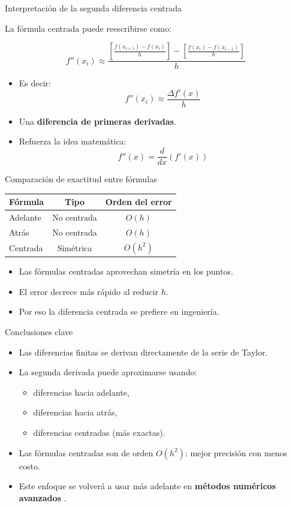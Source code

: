 \documentclass[main.tex]{subfiles}
\begin{document}
\begin{frame}{Interpretación de la segunda diferencia centrada}
\small

La fórmula centrada puede reescribirse como:

\[
f''(x_i) \approx 
\frac{
\left[\frac{f(x_{i+1}) - f(x_i)}{h}\right]
-
\left[\frac{f(x_i) - f(x_{i-1})}{h}\right]
}{h}
\]

\begin{itemize}
  \item Es decir:  
  \[
  f''(x_i) \approx 
  \frac{\Delta f'(x)}{h}
  \]
  \item Una \textbf{diferencia de primeras derivadas}.
  \item Refuerza la idea matemática:
        \[
        f''(x)=\frac{d}{dx}\left(f'(x)\right)
        \]
\end{itemize}

\end{frame}


\begin{frame}{Comparación de exactitud entre fórmulas}
\small

\begin{tabular}{lcc}
\toprule
Fórmula & Tipo & Orden del error \\
\midrule
Adelante & No centrada & \(O(h)\) \\
Atrás    & No centrada & \(O(h)\) \\
Centrada & Simétrica   & \(O(h^2)\) \\
\bottomrule
\end{tabular}

\begin{itemize}
  \item Las fórmulas centradas aprovechan simetría en los puntos.
  \item El error decrece más rápido al reducir \(h\).
  \item Por eso la diferencia centrada se prefiere en ingeniería.
\end{itemize}
\end{frame}


\begin{frame}{Conclusiones clave}
\small

\begin{itemize}
  \item Las diferencias finitas se derivan directamente de la serie de Taylor.
  \item La segunda derivada puede aproximarse usando:
  \begin{itemize}
     \item diferencias hacia adelante,
     \item diferencias hacia atrás,
     \item diferencias centradas (más exactas).
  \end{itemize}
  \item Las fórmulas centradas son de orden \(O(h^2)\):  
        mejor precisión con menos costo.
  \item Este enfoque se volverá a usar más adelante en
        \textbf{métodos numéricos avanzados }.
\end{itemize}
\end{frame}
\end{document}
